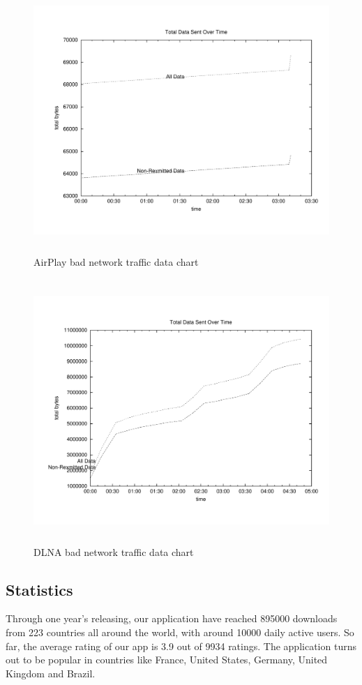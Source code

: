\begin{figure}[htb]
\centering \includegraphics[height=10cm]{charts/AirPlay_traffic_15loss_data}
\caption{AirPlay bad network traffic data chart \label{chart6}}
\end{figure}
\begin{figure}[htb]
\centering \includegraphics[height=10cm]{charts/dlna_traffic_15loss_data}
\caption{DLNA bad network traffic data chart \label{chart6}}
\end{figure}

\subsection{Statistics}
Through one year's releasing, our application have reached 895000 downloads from 223 countries all around the world, with around 10000 daily active users. So far, the average rating of our app is 3.9 out of 9934 ratings. The application turns out to be popular in countries like France, United States, Germany, United Kingdom and Brazil.

